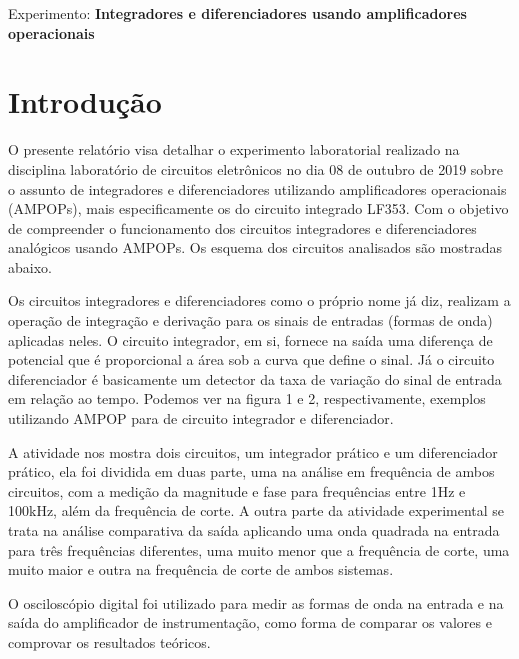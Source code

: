 \begin{center}
\large Experimento: \textbf{Integradores e diferenciadores usando amplificadores operacionais}
\end{center}

\setlength{\abovedisplayskip}{-10pt}
\setlength{\belowdisplayskip}{-10pt}

\section{Introdução}

O presente relatório visa detalhar o experimento laboratorial realizado na disciplina laboratório de circuitos eletrônicos no dia 08 de outubro de 2019 sobre o assunto de integradores e diferenciadores utilizando amplificadores operacionais (AMPOPs), mais especificamente os do circuito integrado LF353. Com o objetivo de compreender o funcionamento dos circuitos integradores e diferenciadores analógicos usando AMPOPs. Os esquema dos circuitos analisados são mostradas abaixo.





Os circuitos integradores e diferenciadores como o próprio nome já diz, realizam a operação de integração e derivação para os sinais de entradas (formas de onda) aplicadas neles. O circuito integrador, em si, fornece na saída uma diferença de potencial que é proporcional a área sob a curva que define o sinal. Já o circuito diferenciador é basicamente um detector da taxa de variação do sinal de entrada em relação ao tempo. Podemos ver na figura 1 e 2, respectivamente, exemplos utilizando AMPOP para de circuito integrador e diferenciador. 

A atividade nos mostra dois circuitos, um integrador prático e um diferenciador prático, ela foi dividida em duas parte, uma na análise em frequência de ambos circuitos, com a medição da magnitude e fase para frequências entre 1Hz e 100kHz, além da frequência de corte. A outra parte da atividade experimental se trata na análise comparativa da saída aplicando uma onda quadrada na entrada para três frequências diferentes, uma muito menor que a frequência de corte, uma muito maior e outra na frequência de corte de ambos sistemas. 

O osciloscópio digital foi utilizado para medir as formas de onda na entrada e na saída do amplificador de instrumentação, como forma de comparar os valores e comprovar os resultados teóricos.


